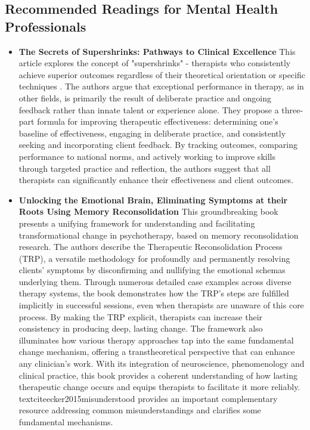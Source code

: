\documentclass[12pt,letterpaper]{article}
\begin{document}
\subsection{Recommended Readings for Mental Health Professionals}
\label{sec:professionalReadings}
\begin{itemize}
	\item \textbf{The Secrets of Supershrinks: Pathways to Clinical Excellence} This article explores the concept of "supershrinks" - therapists who consistently achieve superior outcomes regardless of their theoretical orientation or specific techniques \cite{miller2014secrets}. The authors argue that exceptional performance in therapy, as in other fields, is primarily the result of deliberate practice and ongoing feedback rather than innate talent or experience alone. They propose a three-part formula for improving therapeutic effectiveness: determining one's baseline of effectiveness, engaging in deliberate practice, and consistently seeking and incorporating client feedback. By tracking outcomes, comparing performance to national norms, and actively working to improve skills through targeted practice and reflection, the authors suggest that all therapists can significantly enhance their effectiveness and client outcomes.
	\item \textbf{Unlocking the Emotional Brain, Eliminating Symptoms at their Roots Using Memory Reconsolidation} This groundbreaking book presents a unifying framework for understanding and facilitating transformational change in psychotherapy, based on memory reconsolidation research. The authors describe the Therapeutic Reconsolidation Process (TRP), a versatile methodology for profoundly and permanently resolving clients' symptoms by disconfirming and nullifying the emotional schemas underlying them. Through numerous detailed case examples across diverse therapy systems, the book demonstrates how the TRP's steps are fulfilled implicitly in successful sessions, even when therapists are unaware of this core process. By making the TRP explicit, therapists can increase their consistency in producing deep, lasting change. The framework also illuminates how various therapy approaches tap into the same fundamental change mechanism, offering a transtheoretical perspective that can enhance any clinician's work. With its integration of neuroscience, phenomenology and clinical practice, this book provides a coherent understanding of how lasting therapeutic change occurs and equips therapists to facilitate it more reliably. textcite{ecker2015misunderstood} provides an important complementary resource addressing common misunderstandings and clarifies some fundamental mechanisms.
\end{itemize}
\end{document}
